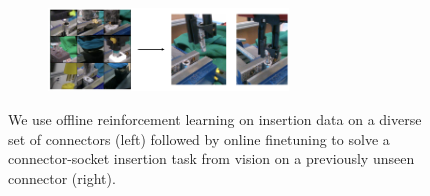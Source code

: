 \documentclass{article}
\begin{document}
\begin{figure}[t]
    \centering
    \begin{subfigure}[b]{0.9\linewidth}
        \center
        \includegraphics[width=0.7\textwidth]{imgs/fig1.png}
    \end{subfigure}

    \caption{We use offline reinforcement learning on insertion data on a diverse set of connectors (left) followed by online finetuning to solve a connector-socket insertion task from vision on a previously unseen connector (right).}
    \label{fig:novel_obj}
    \vspace{-0.5cm}
\end{figure}

\end{document}

